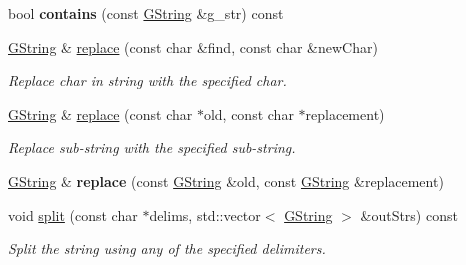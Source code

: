 \begin{Indent}
\begin{DoxyCompactItemize}
\mbox{\label{classrev_1_1_g_string_a5036093b400662b5e08ec82de6618adc}} 
bool {\bfseries contains} (const \mbox{\hyperlink{classrev_1_1_g_string}{G\+String}} \&g\+\_\+str) const
\item 
\mbox{\label{classrev_1_1_g_string_af339969db2cd7b10f77a99ef44d6c70d}} 
\mbox{\hyperlink{classrev_1_1_g_string}{G\+String}} \& \mbox{\hyperlink{classrev_1_1_g_string_af339969db2cd7b10f77a99ef44d6c70d}{replace}} (const char \&find, const char \&new\+Char)
\begin{DoxyCompactList}\small\item\em Replace char in string with the specified char. \end{DoxyCompactList}\item 
\mbox{\label{classrev_1_1_g_string_abdc09f546d8dd2b7c3a33cd4e355c42d}} 
\mbox{\hyperlink{classrev_1_1_g_string}{G\+String}} \& \mbox{\hyperlink{classrev_1_1_g_string_abdc09f546d8dd2b7c3a33cd4e355c42d}{replace}} (const char $\ast$old, const char $\ast$replacement)
\begin{DoxyCompactList}\small\item\em Replace sub-\/string with the specified sub-\/string. \end{DoxyCompactList}\item 
\mbox{\label{classrev_1_1_g_string_aeadc1305716de127405be2aebcc7fe58}} 
\mbox{\hyperlink{classrev_1_1_g_string}{G\+String}} \& {\bfseries replace} (const \mbox{\hyperlink{classrev_1_1_g_string}{G\+String}} \&old, const \mbox{\hyperlink{classrev_1_1_g_string}{G\+String}} \&replacement)
\item 
\mbox{\label{classrev_1_1_g_string_a2c9becd1772f8874f8ef4f76fff770c3}} 
void \mbox{\hyperlink{classrev_1_1_g_string_a2c9becd1772f8874f8ef4f76fff770c3}{split}} (const char $\ast$delims, std\+::vector$<$ \mbox{\hyperlink{classrev_1_1_g_string}{G\+String}} $>$ \&out\+Strs) const
\begin{DoxyCompactList}\small\item\em Split the string using any of the specified delimiters. \end{DoxyCompactList}\item 
\mbox{\label{classrev_1_1_g_string_a238b168af97d9eabb0c6c5f2c4312b40}} 

\end{DoxyCompactItemize}
\end{Indent}
